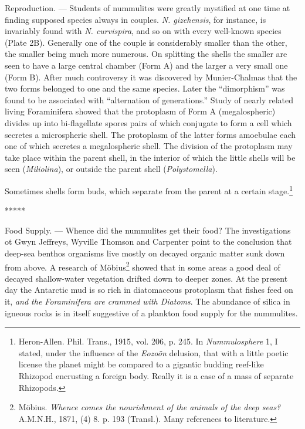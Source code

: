 \documentclass[a4paper, 12pt, oneside]{article}
\begin{document}
Reproduction. --- Students of nummulites were greatly mystified at one time at finding supposed species always in couples. \emph{N. gizehensis}, for instance, is invariably found with \emph{N. curvispira}, and so on with every well-known species (Plate 2B). Generally one of the couple is considerably smaller than the other, the smaller being much more numerous. On splitting the shells the smaller are seen to have a large central chamber (Form A) and the larger a very small one (Form B). After much controversy it was discovered by Munier-Chalmas that the two forms belonged to one and the same species. Later the ``dimorphism'' was found to be associated with ``alternation of generations.'' Study of nearly related living Foraminifera showed that the protoplasm of Form A (megalospheric) divides up into bi-flagellate spores pairs of which conjugate to form a cell which secretes a microspheric shell. The protoplasm of the latter forms amoebulae each one of which secretes a megalospheric shell. The division of the protoplasm may take place within the parent shell, in the interior of which the little shells will be seen (\emph{Miliolina}), or outside the parent shell (\emph{Polystomella}).

Sometimes shells form buds, which separate from the parent at a certain stage.\footnote{Heron-Allen. Phil. Trans., 1915, vol. 206, p. 245. In \emph{Nummulosphere} 1, I stated, under the influence of the \emph{Eozoön} delusion, that with a little poetic license the planet might be compared to a gigantic budding reef-like Rhizopod encrusting a foreign body. Really it is a case of a mass of separate Rhizopods.}

\centerline{*\hspace{15mm}*\hspace{15mm}*\hspace{15mm}*\hspace{15mm}*}
\bigskip

Food Supply. --- Whence did the nummulites get their food? The investigations ot Gwyn Jeffreys, Wyville Thomson and Carpenter point to the conclusion that deep-sea benthos organisms live mostly on decayed organic matter sunk down from above. A research of Möbius\footnote{Möbius. \emph{Whence comes the nourishment of the animals of the deep seas?} A.M.N.H., 1871, (4) 8. p. 193 (Transl.). Many references to literature.} showed that in some areas a good deal of decayed shallow-water vegetation drifted down to deeper zones. At the present day the Antarctic mud is so rich in diatomaceous protoplasm that fishes feed on it, \emph{and the Foraminifera are crammed with Diatoms}. The abundance of silica in igneous rocks is in itself suggestive of a plankton food supply for the nummulites.
\end{document}
